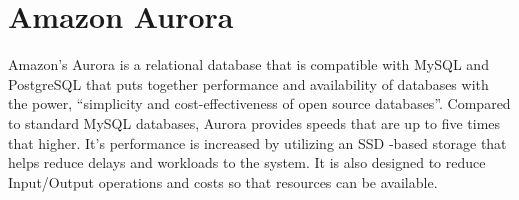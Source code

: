 \section{Amazon Aurora}

Amazon’s Aurora is a relational database that is compatible with MySQL and PostgreSQL that puts together performance and availability of databases with the power, “simplicity and cost-effectiveness of open source databases”\cite{Amazon Aurora}. Compared to standard MySQL databases, Aurora provides speeds that are up to five times that higher. It’s performance is increased by utilizing an SSD -based storage that helps reduce delays and workloads to the system. It is also designed to reduce Input/Output operations and costs so that resources can be available.  

